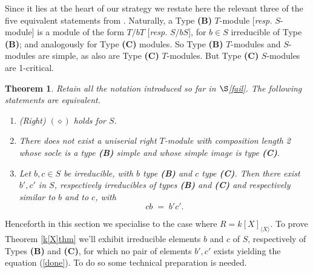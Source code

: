\documentclass[a4paper, 11pt]{article}
\newtheorem{theorem}{Theorem}[section]
\theoremstyle{definition}
\begin{document}
\medskip

Since it lies at the heart of our strategy we restate here the relevant three of the five equivalent statements from \cite[Theorem 6.7]{BCM2}. Naturally, a Type {\bf (B)} $T$-module [{\it resp.} $S$-module] is a module of the form $T/bT$ [{\it resp.} $S/bS$], for $b \in S$ irreducible of Type {\bf (B)}; and analogously for Type {\bf (C)} modules. So Type {\bf (B)} $T$-modules and $S$-modules are simple, as also are Type {\bf (C)} $T$-modules. But Type {\bf (C)} $S$-modules are 1-critical. 

\begin{theorem}\label{target} Retain all the notation introduced so far in $\S$\ref{fail}. The following statements are equivalent.
\begin{enumerate}
\item[(i)] (Right) $(\diamond)$ holds for $ S$.
\item[(ii)] There does not exist a uniserial right $T$-module with composition length 2 whose socle is a type {\bf (B)} simple and whose simple image is type {\bf (C)}.
\item[(iii)] Let $b, c \in  S$ be irreducible, with $b$ type {\bf (B)} and $c$ type {\bf (C)}. Then there exist $b', c'$ in $ S$, respectively irreducibles of types {\bf (B)} and {\bf (C)} and respectively similar to $b$ and to $c$, with
\begin{equation}\label{done} cb \; = \;   b'c'.
\end{equation}
\end{enumerate}
\end{theorem}


\medskip

Henceforth in this section we specialise to the case where $R = k[X]_{\langle X \rangle}$. To prove Theorem \ref{k[X]thm} we'll exhibit irreducible elements $b$ and $c$ of $S$, respectively of Types {\bf (B)} and {\bf (C)}, for which no pair of elements $b', c'$ exists yielding the equation (\ref{done}). To do so some technical preparation is needed. 
\end{document}
